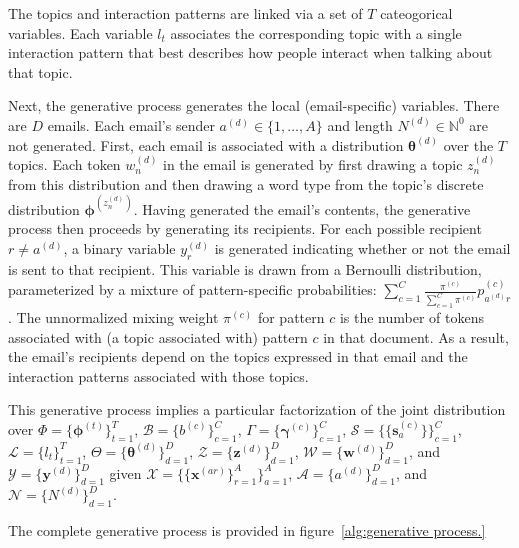 \documentclass{pnastwo}
\newcommand{\bs}{\boldsymbol{s}}
\newcommand{\bw}{\boldsymbol{w}}
\newcommand{\bx}{\boldsymbol{x}}
\newcommand{\by}{\boldsymbol{y}}
\newcommand{\bz}{\boldsymbol{z}}
\newcommand{\bgamma}{\boldsymbol{\gamma}}
\newcommand{\bphi}{\boldsymbol{\phi}}
\newcommand{\btheta}{\boldsymbol{\theta}}
\begin{document}
\begin{article}
The topics and interaction patterns are linked via a set of $T$
cateogorical variables. Each variable $l_t$ associates the
corresponding topic with a single interaction pattern that best
describes how people interact when talking about that topic.

Next, the generative process generates the local (email-specific)
variables. There are $D$ emails. Each email's sender $a^{(d)} \in \{1,
\ldots, A\}$ and length $N^{(d)} \in \mathbb{N}^0$ are not
generated. First, each email is associated with a distribution
$\btheta^{(d)}$ over the $T$ topics. Each token $w_n^{(d)}$ in the
email is generated by first drawing a topic $z_n^{(d)}$ from this
distribution and then drawing a word type from the topic's discrete
distribution $\bphi^{(z_n^{(d)})}$. Having generated the email's
contents, the generative process then proceeds by generating its
recipients. For each possible recipient $r \neq a^{(d)}$, a binary
variable $y^{(d)}_r$ is generated indicating whether or not the email
is sent to that recipient. This variable is drawn from a Bernoulli
distribution, parameterized by a mixture of pattern-specific
probabilities: $\sum_{c=1}^C \frac{\pi^{(c)}}{\sum_{c=1}^C \pi^{(c)}}
p^{(c)}_{a^{(d)}r}$. The unnormalized mixing weight $\pi^{(c)}$ for
pattern $c$ is the number of tokens associated with (a topic
associated with) pattern $c$ in that document. As a result, the
email's recipients depend on the topics expressed in that email and
the interaction patterns associated with those topics.

This generative process implies a particular factorization of the
joint distribution over $\Phi = \{ \bphi^{(t)} \}_{t=1}^T$,
$\mathcal{B} = \{ b^{(c)} \}_{c=1}^C$, $\Gamma = \{ \bgamma^{(c)}
\}_{c=1}^C$, $\mathcal{S} = \{ \{ \bs^{(c)}_a \} \}_{c=1}^C$,
$\mathcal{L} = \{ l_t\}_{t=1}^T$, $\Theta = \{ \btheta^{(d)}
\}_{d=1}^D$, $\mathcal{Z} = \{ \bz^{(d)} \}_{d=1}^D$, $\mathcal{W} =
\{ \bw^{(d)} \}_{d=1}^D$, and $\mathcal{Y} = \{ \by^{(d)} \}_{d=1}^D$
given $\mathcal{X} = \{ \{ \bx^{(ar)} \}_{r=1}^A \}_{a=1}^A$,
$\mathcal{A} = \{ a^{(d)} \}_{d=1}^D$, and $\mathcal{N} = \{ N^{(d)}
\}_{d=1}^D$.

The complete generative process is provided in
figure~\ref{alg:generative process.}


\end{article}
\end{document}
